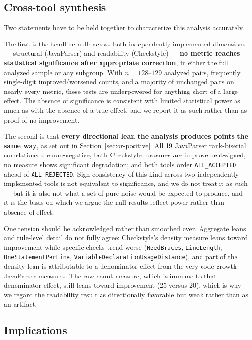 \subsection{Cross-tool synthesis}
\label{sec:or-synthesis}

Two statements have to be held together to characterize this analysis accurately.

The first is the headline null: across both independently implemented dimensions --- structural (JavaParser) and readability (Checkstyle) --- \textbf{no metric reaches statistical significance after appropriate correction}, in either the full analyzed sample or any subgroup.
With $n=128$--$129$ analyzed pairs, frequently single-digit improved/worsened counts, and a majority of unchanged pairs on nearly every metric, these tests are underpowered for anything short of a large effect.
The absence of significance is consistent with limited statistical power as much as with the absence of a true effect, and we report it as such rather than as proof of no improvement.

The second is that \textbf{every directional lean the analysis produces points the same way}, as set out in Section~\ref{sec:or-positive}.
All 19 JavaParser rank-biserial correlations are non-negative; both Checkstyle measures are improvement-signed; no measure shows significant degradation; and both tools order \texttt{ALL\_ACCEPTED} ahead of \texttt{ALL\_REJECTED}.
Sign consistency of this kind across two independently implemented tools is not equivalent to significance, and we do not treat it as such --- but it is also not what a set of pure noise would be expected to produce, and it is the basis on which we argue the null results reflect power rather than absence of effect.

One tension should be acknowledged rather than smoothed over.
Aggregate leans and rule-level detail do not fully agree: Checkstyle's density measure leans toward improvement while specific checks trend worse (\texttt{NeedBraces}, \texttt{LineLength}, \texttt{OneStatementPerLine}, \texttt{VariableDeclarationUsageDistance}), and part of the density lean is attributable to a denominator effect from the very code growth JavaParser measures.
The raw-count measure, which is immune to that denominator effect, still leans toward improvement (25 versus 20), which is why we regard the readability result as directionally favorable but weak rather than as an artifact.

\subsection{Implications}
\label{sec:or-implications}

